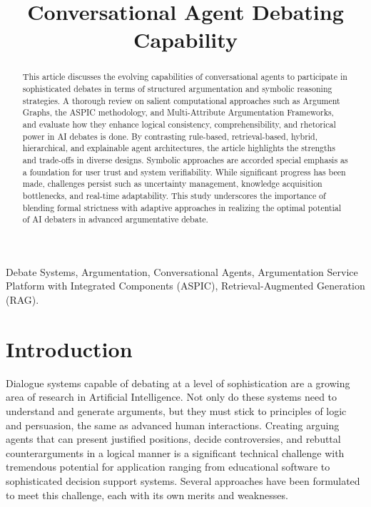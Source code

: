 \documentclass[conference]{IEEEtran}
\begin{document}
\title{Conversational Agent Debating Capability}

\author{
\and
{}
}

\maketitle

\begin{abstract}
This article discusses the evolving capabilities of conversational agents to participate in sophisticated debates in terms of structured argumentation and symbolic reasoning strategies. A thorough review on salient computational approaches such as Argument Graphs, the ASPIC methodology, and Multi-Attribute Argumentation Frameworks, and evaluate how they enhance logical consistency, comprehensibility, and rhetorical power in AI debates is done. By contrasting rule-based, retrieval-based, hybrid, hierarchical, and explainable agent architectures, the article highlights the strengths and trade-offs in diverse designs. Symbolic approaches are accorded special emphasis as a foundation for user trust and system verifiability. While significant progress has been made, challenges persist such as uncertainty management, knowledge acquisition bottlenecks, and real-time adaptability. This study underscores the importance of blending formal strictness with adaptive approaches in realizing the optimal potential of AI debaters in advanced argumentative debate.
\end{abstract}

\begin{IEEEkeywords}
Debate Systems, Argumentation, Conversational Agents, Argumentation Service Platform with Integrated Components (ASPIC), Retrieval-Augmented Generation (RAG).
\end{IEEEkeywords}

\section{Introduction}
Dialogue systems capable of debating at a level of sophistication are a growing area of research in Artificial Intelligence. Not only do these systems need to understand and generate arguments, but they must stick to principles of logic and persuasion, the same as advanced human interactions. Creating arguing agents that can present justified positions, decide controversies, and rebuttal counterarguments in a logical manner is a significant technical challenge with tremendous potential for application ranging from educational software to sophisticated decision support systems. Several approaches have been formulated to meet this challenge, each with its own merits and weaknesses.
\end{document}
